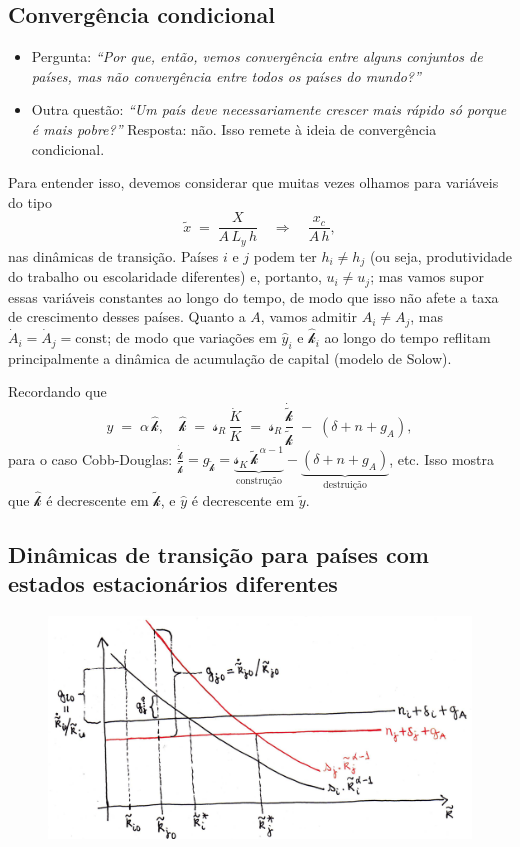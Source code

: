 \documentclass[a4paper,12pt]{article}[abntex2]
\begin{document}
\subsection{\textbf{Convergência condicional}}

\begin{itemize}
    \item Pergunta: 
    \emph{``Por que, então, vemos convergência entre alguns conjuntos de países, 
    mas não convergência entre todos os países do mundo?''}

    \item Outra questão: 
    \emph{``Um país deve necessariamente crescer mais rápido só porque é mais pobre?''} 
    Resposta: não. Isso remete à ideia de convergência condicional.
\end{itemize}

Para entender isso, devemos considerar que muitas vezes olhamos para variáveis do tipo 
\[
  \tilde{x} \;=\; \frac{X}{A\,L_y\,h}
  \quad\Longrightarrow\quad
  \frac{x_c}{A\,h},
\]
nas dinâmicas de transição. Países \(i\) e \(j\) podem ter \(h_i \neq h_j\) 
(ou seja, produtividade do trabalho ou escolaridade diferentes) e, portanto, \(u_i \neq u_j\); 
mas vamos supor essas variáveis constantes ao longo do tempo, de modo que isso não afete 
a taxa de crescimento desses países. Quanto a \(A\), vamos admitir \(A_i \neq A_j\), 
mas \(\dot{A}_i = \dot{A}_j = \text{const}\); de modo que variações em \(\hat{y}_i\) 
e \(\hat{\mathcal{k}}_i\) ao longo do tempo reflitam principalmente a dinâmica de acumulação de capital 
(modelo de Solow).

Recordando que
\[
  \hat{y} \;=\; \alpha \,\hat{\mathcal{k}},
  \quad
  \hat{\mathcal{k}} \;=\; \mathcal{s}_R \,\frac{\dot{K}}{K}
  \;=\; \mathcal{s}_R \,\frac{\dot{\tilde{\mathcal{k}}}}{\tilde{\mathcal{k}}}
  \;-\; (\delta + n + g_A),
\]
para o caso Cobb-Douglas:
\(\frac{\dot{\tilde{\mathcal{k}}}}{\tilde{\mathcal{k}}} = g_{\tilde{\mathcal{k}}}= \underbrace{\mathcal{s}_K \,\tilde{\mathcal{k}}^{\,\alpha-1}}_\text{construção} - \underbrace{(\delta + n + g_A)}_\text{destruição}\), etc. 
Isso mostra que \(\hat{\mathcal{k}}\) é decrescente em \(\tilde{\mathcal{k}}\), e \(\hat{y}\) é decrescente 
em \(\tilde{y}\).

\subsection{\textbf{Dinâmicas de transição para países com estados estacionários diferentes}}

\begin{figure}[H]
    \centering
    \includegraphics[width=0.7\linewidth]{Imagens/a13i1.png}
\end{figure}
\end{document}
